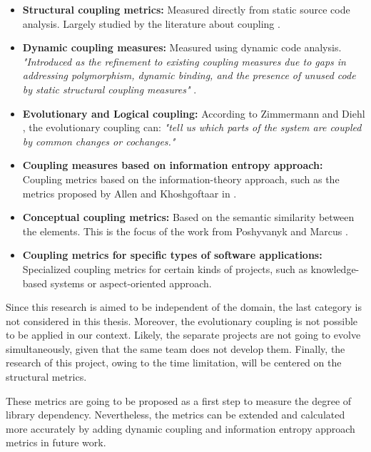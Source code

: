 \begin{itemize}
  \item \textbf{Structural coupling metrics:} Measured directly from static source code analysis. Largely studied by the literature about coupling \cite{briand1999unified, poshyvanyk2006conceptual, briand1997investigation, eder1994coupling}.

  \item \textbf{Dynamic coupling measures:} Measured using dynamic code analysis. \textit{"Introduced as the refinement to existing coupling measures due to gaps in addressing polymorphism, dynamic binding, and the presence of unused code by static structural coupling measures"} \cite{poshyvanyk2006conceptual}.

  \item \textbf{Evolutionary and Logical coupling:} According to Zimmermann and Diehl \cite{zimmermann2005mining}, the evolutionary coupling can: \textit{"tell us which parts of the system are coupled by common changes or cochanges."}

  \item \textbf{Coupling measures based on information entropy approach:} Coupling metrics based on the information-theory approach, such as the metrics proposed by Allen and Khoshgoftaar in \cite{allen1999measuring}.

  \item \textbf{Conceptual coupling metrics:} Based on the semantic similarity between the elements. This is the focus of the work from Poshyvanyk and Marcus \cite{poshyvanyk2006conceptual}.

  \item \textbf{Coupling metrics for specific types of software applications:} Specialized coupling metrics for certain kinds of projects, such as knowledge-based systems or aspect-oriented approach.
\end{itemize}

\blankl
Since this research is aimed to be independent of the domain, the last category is not considered in this thesis. Moreover, the evolutionary coupling is not possible to be applied in our context. Likely, the separate projects are not going to evolve simultaneously, given that the same team does not develop them. Finally, the research of this project, owing to the time limitation, will be centered on the structural metrics.

These metrics are going to be proposed as a first step to measure the degree of library dependency. Nevertheless, the metrics can be extended and calculated more accurately by adding dynamic coupling and information entropy approach metrics in future work.

